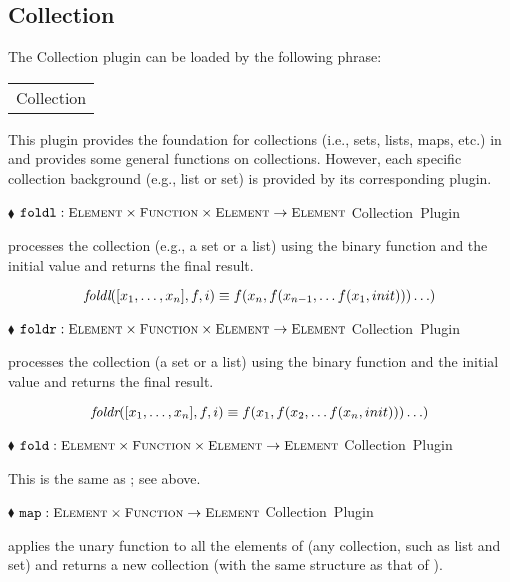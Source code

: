 \documentclass{article}
\newcommand{\codebf}[1]{\xspace{\bf \code{#1}}\xspace}
\newcommand{\keyword}[1]{\codebf{#1}}
\newcommand{\funcform}[2]{\pform{$\blacklozenge$}{#1}{#2}}
\newcommand{\pform}[3]{\vspace*{4mm} \noindent #1 #2 \vspace{1mm}\textcolor[gray]{0.7}{\dotfill}\mbox{{\sffamily \footnotesize #3}}}
\newcommand{\bExample}{\begin{small} \vspace{0.3cm} \begin{tabular}{|l} \begin{minipage}{0.85\textwidth} \vspace{0.2cm} \ttfamily}
\newcommand{\eExample}{\vspace{0.2cm} \end{minipage} \end{tabular} \vspace{0.3cm} \end{small}}
\begin{document}
\subsection{Collection}

The Collection plugin can be loaded by the following \keyword{use} phrase:

\bExample
	\codebf{use} Collection
\eExample

This plugin provides the foundation for collections (i.e., sets, lists, maps, etc.) in \CoreASM and provides some general functions 
on collections. However, each specific collection background (e.g., list or set) is provided by its corresponding plugin. 

\funcform{$\mbox{{\ttfamily foldl}} : \mbox{\scshape\small Element} \times \mbox{\scshape\small Function} \times \mbox{\scshape\small Element} \rightarrow \mbox{\scshape\small Element}$}{Collection Plugin}

 processes the collection  (e.g., a set or a list) using the binary function  and the initial value  and returns the final result.

\[ \mbox{\it foldl} ([x_1,\ldots,x_n], f, i) \equiv f(x_n, f(x_{n-1}, \ldots f(x_1, init))) \ldots ) \] 
 
\funcform{$\mbox{{\ttfamily foldr}} : \mbox{\scshape\small Element} \times \mbox{\scshape\small Function} \times \mbox{\scshape\small Element} \rightarrow \mbox{\scshape\small Element}$}{Collection Plugin}

 processes the collection  (a set or a list)
using the binary function  and the initial value
 and returns the final result.

\[ \mbox{\it foldr} ([x_1,\ldots,x_n], f, i) \equiv f(x_1, f(x_2, \ldots f(x_n, init))) \ldots ) \] 
 
\funcform{$\mbox{{\ttfamily fold}} : \mbox{\scshape\small Element} \times \mbox{\scshape\small Function} \times \mbox{\scshape\small Element} \rightarrow \mbox{\scshape\small Element}$}{Collection Plugin}

This is the same as ; see above.

\funcform{$\mbox{{\ttfamily map}} : \mbox{\scshape\small Element} \times \mbox{\scshape\small Function} \rightarrow \mbox{\scshape\small Element}$}{Collection Plugin}

 applies the unary function  to all the elements of  (any collection, such as list and set) 
and returns a new collection (with the same structure as that of ).  
\end{document}
